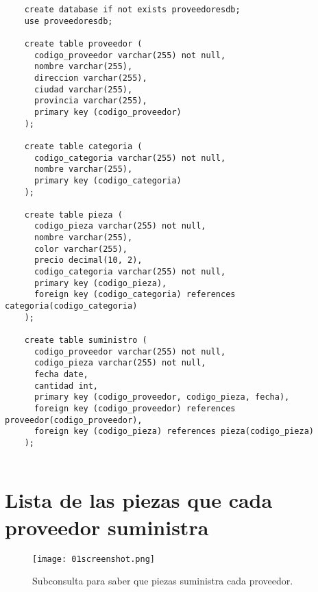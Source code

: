 \documentclass{article}
\begin{document}
\begin{lstlisting}
    create database if not exists proveedoresdb;
    use proveedoresdb;
    
    create table proveedor (
      codigo_proveedor varchar(255) not null,
      nombre varchar(255),
      direccion varchar(255),
      ciudad varchar(255),
      provincia varchar(255),
      primary key (codigo_proveedor)
    );
    
    create table categoria (
      codigo_categoria varchar(255) not null,
      nombre varchar(255),
      primary key (codigo_categoria)
    );
    
    create table pieza (
      codigo_pieza varchar(255) not null,
      nombre varchar(255),
      color varchar(255),
      precio decimal(10, 2),
      codigo_categoria varchar(255) not null,
      primary key (codigo_pieza),
      foreign key (codigo_categoria) references categoria(codigo_categoria)
    );
    
    create table suministro (
      codigo_proveedor varchar(255) not null,
      codigo_pieza varchar(255) not null,
      fecha date,
      cantidad int,
      primary key (codigo_proveedor, codigo_pieza, fecha),
      foreign key (codigo_proveedor) references proveedor(codigo_proveedor),
      foreign key (codigo_pieza) references pieza(codigo_pieza)
    );
    
\end{lstlisting}

\newpage %



\newpage %

\section*{Lista  de las piezas que cada proveedor suministra}

\begin{figure}[ht]
    \centering
    {
        \texttt{[image: 01screenshot.png]} %
    }
    \caption{Subconsulta para saber que piezas suministra cada proveedor.}
\end{figure}
\end{document}
